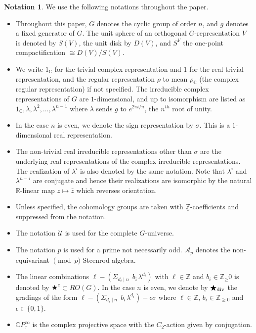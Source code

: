 \documentclass[a4paper,leqno,11pt]{amsart}
\theoremstyle{plain}
\theoremstyle{definition}
\newtheorem{notation}[theorem]{Notation}
\theoremstyle{remark}
\theoremstyle{definition}
\newcommand{\C}{{\mathbb C}}
\newcommand{\Z}{{\mathbb{Z}}}
\newcommand{\R}{{\mathbb R}}
\newcommand{\uZ}{\underline{\mathbb{Z}}}
\def\Z{\mathbb{Z}}
\def\C{\mathbb{C}}
\numberwithin{equation}{section}
\begin{document}
	\begin{notation}  We use the following notations throughout the paper.
		\begin{itemize} 
\item Throughout this paper, $G$ denotes the cyclic group of order $n$, and $g$ denotes a fixed generator of $G$.  The unit sphere of an orthogonal $G$-representation $V$  is denoted by $ S(V) $, the unit disk by $D(V)$, and $S^V$ the one-point compactification $\cong D(V)/S(V)$.  
\item  We write $ 1_\C $ for the trivial complex representation and $ 1 $ for the real trivial representation, and the regular representation $ \rho $ to mean $ \rho_\C $ (the complex regular representation) if not specified. 	The irreducible complex representations of $G$ are $1$-dimensional, and up to isomorphism are listed as $1_\C,\lambda, \lambda^2,\dots, \lambda^{n-1}$ where $\lambda$ sends $g$ to  $e^{2\pi i/n}$, the $n^{th}$ root of unity. 
\item In the case $n$ is even, we denote the sign representation by $\sigma$. This is a $1$-dimensional real representation.  
\item  The non-trivial real irreducible representations other than $\sigma$ are the underlying real representations of the complex irreducible representations. The realization of $\lambda^i$ is also denoted by the same notation. Note that $\lambda^i$ and $\lambda^{n-i}$ are conjugate and hence their realizations are isomorphic by the natural $\R$-linear map $z\mapsto \bar{z}$ which reverses orientation.
\item  Unless specified, the cohomology groups are taken  with $ \uZ $-coefficients and suppressed from the notation.
\item  The notation  $\mathcal{U}$ is used for the complete  $G$-universe.
			\item The notation $ p $ is used for a prime not necessarily odd. $ \mathcal{A}_p $ denotes the non-equivariant $\pmod p $ Steenrod algebra.
			\item The linear combinations $ \ell -(\Sigma_{d_i \mid n}~~b_i\mspace{2mu} \lambda^{d_i}) $  with $\ell  \in \Z$ and $ b_i\in \Z_\ge0 $  is denoted by $ \bigstar^e \subset RO(G) $. In the case $n$ is even,  we denote by $\bigstar_{\textup{div}}$ the gradings of the form $\ell -(\Sigma_{d_i \mid n}~~b_i\mspace{2mu} \lambda^{d_i}) - \epsilon \sigma$ where $\ell \in \Z$, $b_i \in \Z_{\geq 0}$ and $\epsilon \in \{0,1\}$. 
			\item $ \C P^\infty_\tau $ is the complex projective space with the $ C_2 $-action given by conjugation.
		\end{itemize}
		
	\end{notation}
	
\end{document}
